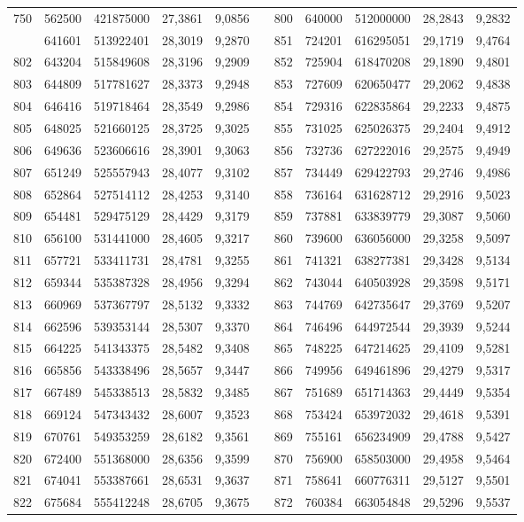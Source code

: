 \begin{longtable}{rrrrrrrrrrr}
750&562500&421875000&27,3861&9,0856&&800&640000&512000000&28,2843&9,2832\\
\newpage
801&641601&513922401&28,3019&9,2870&&851&724201&616295051&29,1719&9,4764\\
802&643204&515849608&28,3196&9,2909&&852&725904&618470208&29,1890&9,4801\\
803&644809&517781627&28,3373&9,2948&&853&727609&620650477&29,2062&9,4838\\
804&646416&519718464&28,3549&9,2986&&854&729316&622835864&29,2233&9,4875\\
805&648025&521660125&28,3725&9,3025&&855&731025&625026375&29,2404&9,4912\\
806&649636&523606616&28,3901&9,3063&&856&732736&627222016&29,2575&9,4949\\
807&651249&525557943&28,4077&9,3102&&857&734449&629422793&29,2746&9,4986\\
808&652864&527514112&28,4253&9,3140&&858&736164&631628712&29,2916&9,5023\\
809&654481&529475129&28,4429&9,3179&&859&737881&633839779&29,3087&9,5060\\
810&656100&531441000&28,4605&9,3217&&860&739600&636056000&29,3258&9,5097\\
811&657721&533411731&28,4781&9,3255&&861&741321&638277381&29,3428&9,5134\\
812&659344&535387328&28,4956&9,3294&&862&743044&640503928&29,3598&9,5171\\
813&660969&537367797&28,5132&9,3332&&863&744769&642735647&29,3769&9,5207\\
814&662596&539353144&28,5307&9,3370&&864&746496&644972544&29,3939&9,5244\\
815&664225&541343375&28,5482&9,3408&&865&748225&647214625&29,4109&9,5281\\
816&665856&543338496&28,5657&9,3447&&866&749956&649461896&29,4279&9,5317\\
817&667489&545338513&28,5832&9,3485&&867&751689&651714363&29,4449&9,5354\\
818&669124&547343432&28,6007&9,3523&&868&753424&653972032&29,4618&9,5391\\
819&670761&549353259&28,6182&9,3561&&869&755161&656234909&29,4788&9,5427\\
820&672400&551368000&28,6356&9,3599&&870&756900&658503000&29,4958&9,5464\\
821&674041&553387661&28,6531&9,3637&&871&758641&660776311&29,5127&9,5501\\
822&675684&555412248&28,6705&9,3675&&872&760384&663054848&29,5296&9,5537\\

\end{longtable}
